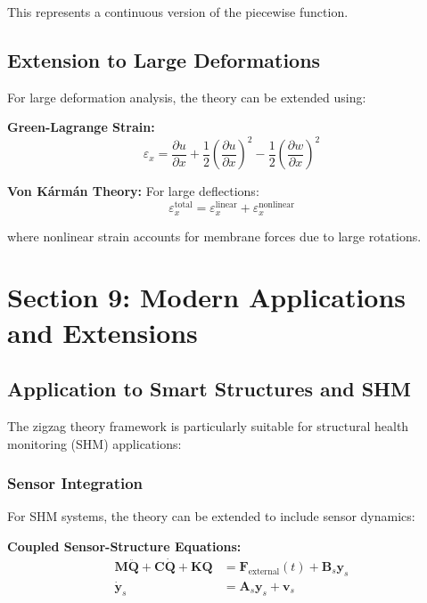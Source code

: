\documentclass[12pt,a4paper]{article}
\begin{document}
This represents a continuous version of the piecewise function.

\subsection{Extension to Large Deformations}

For large deformation analysis, the theory can be extended using:

\textbf{Green-Lagrange Strain:}
\begin{equation}
\varepsilon_x = \frac{\partial u}{\partial x} + \frac{1}{2}\left(\frac{\partial u}{\partial x}\right)^2 - \frac{1}{2}\left(\frac{\partial w}{\partial x}\right)^2
\end{equation}

\textbf{Von Kármán Theory:} For large deflections:
\begin{equation}
\varepsilon_x^{\text{total}} = \varepsilon_x^{\text{linear}} + \varepsilon_x^{\text{nonlinear}}
\end{equation}

where nonlinear strain accounts for membrane forces due to large rotations.

\section{Section 9: Modern Applications and Extensions}

\subsection{Application to Smart Structures and SHM}

The zigzag theory framework is particularly suitable for structural health monitoring (SHM) applications:

\subsubsection{Sensor Integration}

For SHM systems, the theory can be extended to include sensor dynamics:

\textbf{Coupled Sensor-Structure Equations:}
\begin{align}
\mathbf{M}\ddot{\mathbf{Q}} + \mathbf{C}\dot{\mathbf{Q}} + \mathbf{K}\mathbf{Q} &= \mathbf{F}_{\text{external}}(t) + \mathbf{B}_s\mathbf{y}_s \\
\dot{\mathbf{y}}_s &= \mathbf{A}_s\mathbf{y}_s + \mathbf{v}_s
\end{align}
\end{document}
